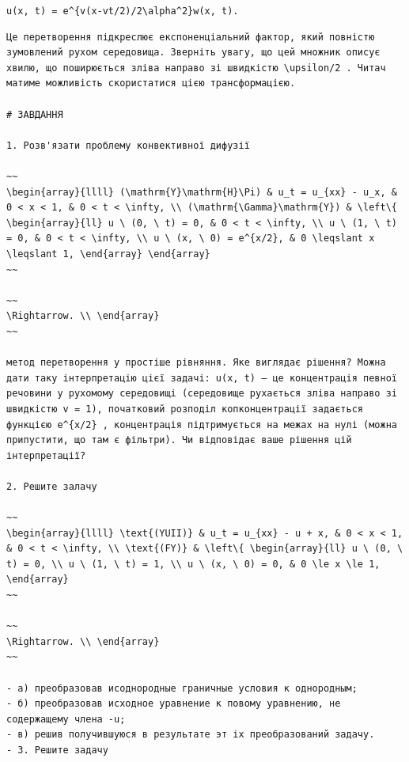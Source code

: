\documentclass[
  ukrainian,
]{article}
\begin{document}
\texttt{u(x,\ t)\ =\ e\^{}\{v(x-vt/2)/2\textbackslash{}alpha\^{}2\}w(x,\ t).}

\begin{verbatim}
Це перетворення підкреслює експоненціальний фактор, який повністю зумовлений рухом середовища. Зверніть увагу, що цей множник описує хвилю, що поширюється зліва направо зі швидкістю \upsilon/2 . Читач матиме можливість скористатися цією трансформацією.

# ЗАВДАННЯ

1. Розв'язати проблему конвективної дифузії

~~
\begin{array}{llll} (\mathrm{Y}\mathrm{H}\Pi) & u_t = u_{xx} - u_x, & 0 < x < 1, & 0 < t < \infty, \\ (\mathrm{\Gamma}\mathrm{Y}) & \left\{ \begin{array}{ll} u \ (0, \ t) = 0, & 0 < t < \infty, \\ u \ (1, \ t) = 0, & 0 < t < \infty, \\ u \ (x, \ 0) = e^{x/2}, & 0 \leqslant x \leqslant 1, \end{array} \end{array}
~~

~~
\Rightarrow. \\ \end{array}
~~

метод перетворення у простіше рівняння. Яке виглядає рішення? Можна дати таку інтерпретацію цієї задачі: u(x, t) — це концентрація певної речовини у рухомому середовищі (середовище рухається зліва направо зі швидкістю v = 1), початковий розподіл копконцентрації задається функцією e^{x/2} , концентрація підтримується на межах на нулі (можна припустити, що там є фільтри). Чи відповідає ваше рішення цій інтерпретації?

2. Решите залачу

~~
\begin{array}{llll} \text{(YUII)} & u_t = u_{xx} - u + x, & 0 < x < 1, & 0 < t < \infty, \\ \text{(FY)} & \left\{ \begin{array}{ll} u \ (0, \ t) = 0, \\ u \ (1, \ t) = 1, \\ u \ (x, \ 0) = 0, & 0 \le x \le 1, \end{array}
~~

~~
\Rightarrow. \\ \end{array}
~~

- а) преобразовав исоднородные граничные условия к однородным;
- б) преобразовав исходное уравнение к повому уравнению, не содержащему члена -u;
- в) решив получившуюся в результате эт іх преобразований задачу.
- 3. Решите задачу
\end{verbatim}
\end{document}
